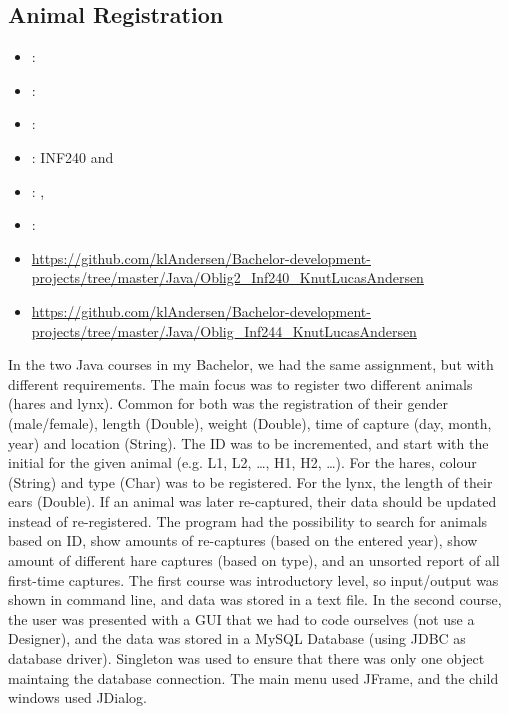 \label{sec:section4}

\subsection{Animal Registration}
\label{sec:animal_registration}
\begin{itemize} 
	\item {}: 
	\item {}: 
	\item {}: 
	\item {}: INF240 and  
	\item {}: , 
	\item {}: 
	\item {} \url{https://github.com/klAndersen/Bachelor-development-projects/tree/master/Java/Oblig2_Inf240_KnutLucasAndersen}
	\item {} \url{https://github.com/klAndersen/Bachelor-development-projects/tree/master/Java/Oblig_Inf244_KnutLucasAndersen}
\end{itemize} 
In the two Java courses in my Bachelor, we had the same assignment, but with different requirements. 
The main focus was to register two different animals (hares and lynx). 
Common for both was the registration of their gender (male/female), length (Double), weight (Double), time of capture (day, month, year) and location (String). 
The ID was to be incremented, and start with the initial for the given animal (e.g. L1, L2, \ldots, H1, H2, \ldots). 
For the hares, colour (String) and type (Char) was to be registered. 
For the lynx, the length of their ears (Double).
\vspace{0.5em}\newline
If an animal was later re-captured, their data should be updated instead of re-registered. 
The program had the possibility to search for animals based on ID, show amounts of re-captures (based on the entered year), 
show amount of different hare captures (based on type), and an unsorted report of all first-time captures.
\vspace{0.5em}\newline
The first course was introductory level, so input/output was shown in command line, and data was stored in a text file. 
In the second course, the user was presented with a GUI that we had to code ourselves (not use a Designer), and the data was stored in a MySQL Database 
(using JDBC as database driver). 
Singleton was used to ensure that there was only one object maintaing the database connection. 
The main menu used JFrame, and the child windows used JDialog.

